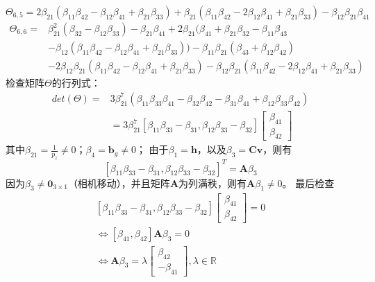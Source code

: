 \documentclass{article}
\begin{document}
\begin{equation}
    \Theta_{6,5}=2\beta_{21}(\beta_{11}\beta_{42}-\beta_{12}\beta_{41}+\beta_{21}\beta_{33})
    +\beta_{21}(\beta_{11}\beta_{42}-2\beta_{12}\beta_{41}+\beta_{21}\beta_{33})-\beta_{12}\beta_{21}\beta_{41}
\end{equation}
\begin{equation}
    \begin{array}{ll}
        \Theta_{6,6} = &\beta_{21}^{2}(\beta_{32}-\beta_{12}\beta_{33})-\beta_{21}\beta_{41}
        +2\beta_{21}(\beta_{41}+\beta_{21}\beta_{32}-\beta_{11}\beta_{43}\\
        &-\beta_{12}(\beta_{11}\beta_{42}-\beta_{12}\beta_{41}+\beta_{21}\beta_{33}))
        -\beta_{11}\beta_{21}(\beta_{43}+\beta_{12}\beta_{42})\\
        &-2\beta_{12}\beta_{21}(\beta_{11}\beta_{42}-\beta_{12}\beta_{41}+\beta_{21}\beta_{33})
        -\beta_{12}\beta_{21}(\beta_{11}\beta_{42}-2\beta_{12}\beta_{41}+\beta_{21}\beta_{33})
    \end{array}
\end{equation}
检查矩阵$\Theta$的行列式：
\begin{equation}
    \begin{array}{ll}
        det(\Theta)=&3\beta_{21}^{7}(\beta_{11}\beta_{33}\beta_{41}-\beta_{32}\beta_{42}-\beta_{31}\beta_{41}
        +\beta_{12}\beta_{33}\beta_{42})\\
        &=3\beta_{21}^{7}\left[\beta_{11}\beta_{33}-\beta_{31}, \beta_{12}\beta_{33}-\beta_{32}\right]
        \left[\begin{array}{c}
            \beta_{41}\\\beta_{42}
        \end{array}\right]
    \end{array}
\end{equation}
其中$\beta_{21}=\frac{1}{p_z}\not=0$；$\beta_4=\textbf{b}_{g}\not=0$；
由于$\beta_1=\textbf{h}$，以及$\beta_3=\textbf{Cv}$，则有
\begin{equation}
    \left[\beta_{11}\beta_{33}-\beta_{31}, \beta_{12}\beta_{33}-\beta_{32}\right]^T=\textbf{A}\beta_3
\end{equation}
因为$\beta_3\not=\textbf{0}_{3\times 1}$（相机移动），并且矩阵$\textbf{A}$为列满秩，则有$\textbf{A}\beta_1\not=0$。
最后检查
\begin{equation}
    \begin{array}{c}
        \left[\beta_{11}\beta_{33}-\beta_{31}, \beta_{12}\beta_{33}-\beta_{32}\right]
        \left[\begin{array}{c}
            \beta_{41}\\\beta_{42}
        \end{array}\right]=0\\
        \Leftrightarrow \left[\beta_{41},\beta_{42}\right]\textbf{A}\beta_3=0\\
    \Leftrightarrow \textbf{A}\beta_3=
        \lambda\left[\begin{array}{c}\beta_{42}\\-\beta_{41} \end{array}\right],\lambda\in\mathbb{R}
    \end{array}
\end{equation}
\end{document}
